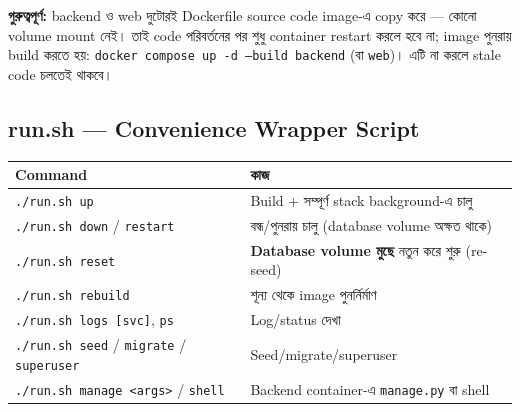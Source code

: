 \documentclass[11pt,a4paper]{article}
\newcommand{\code}[1]{\texttt{\small #1}}
\newcommand{\summarybox}[1]{%
  \begin{center}
  \colorbox{softbg}{\parbox{0.94\textwidth}{#1}}
  \end{center}
}
\begin{document}
\summarybox{%
  \textbf{গুরুত্বপূর্ণ:} backend ও web দুটোরই Dockerfile source code image-এ copy করে ---
  কোনো volume mount নেই। তাই code পরিবর্তনের পর শুধু container restart করলে হবে না; image
  পুনরায় build করতে হয়: \code{docker compose up -d --build backend} (বা \code{web})। এটি না
  করলে stale code চলতেই থাকবে।
}

\subsection{run.sh --- Convenience Wrapper Script}
\begin{longtable}{@{}p{3.6cm}p{12.4cm}@{}}
\toprule
\textbf{Command} & \textbf{কাজ} \\
\midrule
\endhead
\code{./run.sh up} & Build \;+\; সম্পূর্ণ stack background-এ চালু \\
\code{./run.sh down} / \code{restart} & বন্ধ/পুনরায় চালু (database volume অক্ষত থাকে) \\
\code{./run.sh reset} & \textbf{Database volume মুছে} নতুন করে শুরু (re-seed) \\
\code{./run.sh rebuild} & শূন্য থেকে image পুনর্নির্মাণ \\
\code{./run.sh logs [svc]}, \code{ps} & Log/status দেখা \\
\code{./run.sh seed} / \code{migrate} / \code{superuser} & Seed/migrate/superuser \\
\code{./run.sh manage <args>} / \code{shell} & Backend container-এ \code{manage.py} বা shell \\
\bottomrule
\end{longtable}
\end{document}
